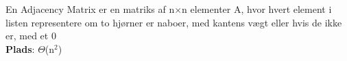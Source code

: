 En Adjacency Matrix er en matriks af n$\times$n elementer A, hvor hvert element i listen representere om to hjørner er naboer, med kantens vægt eller hvis de ikke er, med et 0\\
\textbf{Plads}: $\Theta$(n$^2$)
